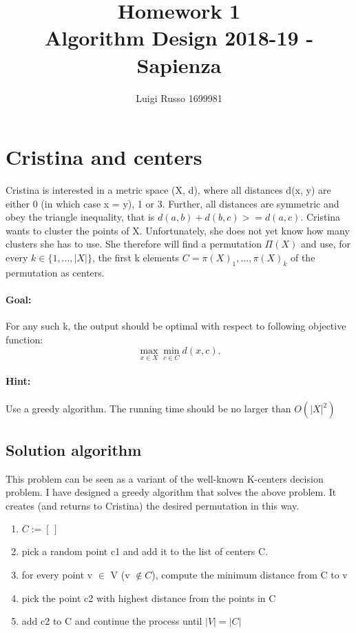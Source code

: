 \documentclass[12pt]{article}
\title{Homework 1\\
	\large Algorithm Design 2018-19 - Sapienza}
\author{Luigi Russo 1699981}
\begin{document}
	
\maketitle

\section{Cristina and centers}
Cristina is interested in a metric space (X, d), where all distances d(x, y) are
either 0 (in which case x = y), 1 or 3. Further, all distances are symmetric and obey the triangle inequality, that is $d(a, b) + d(b, c) >= d(a, c)$. Cristina wants to cluster the points of X. Unfortunately, she does not yet know how many clusters she has to use. She therefore will find a permutation $\Pi(X)$ and use, for every $k \in \{1, ..., |X|\}$, the first k elements $C =
{\pi(X)_1, ..., \pi(X)_k}$ of the permutation as centers.
\paragraph*{Goal:} For any such k, the output should be optimal with respect to following objective function:
\begin{equation}
\max_{x \in X} \min_{c \in C} d(x,c).
\end{equation}
\paragraph*{Hint:} Use a greedy algorithm. The running time should be no larger than $O(|X|^2)$

\subsection*{Solution algorithm}
This problem can be seen as a variant of the well-known K-centers decision problem. I have designed a greedy algorithm that solves the above problem.
It creates (and returns to Cristina) the desired permutation in this way.
\begin{enumerate}
	\item $C:= [\,]$
	\item pick a random point c1 and add it to the list of centers C.
	\item for every point v $\in$ V (v $\notin C$), compute the minimum distance from C to v 
	\item pick the point c2 with highest distance from the points in C
	\item add c2 to C and continue the process until $|V| = |C|$
\end{enumerate}
\end{document}
